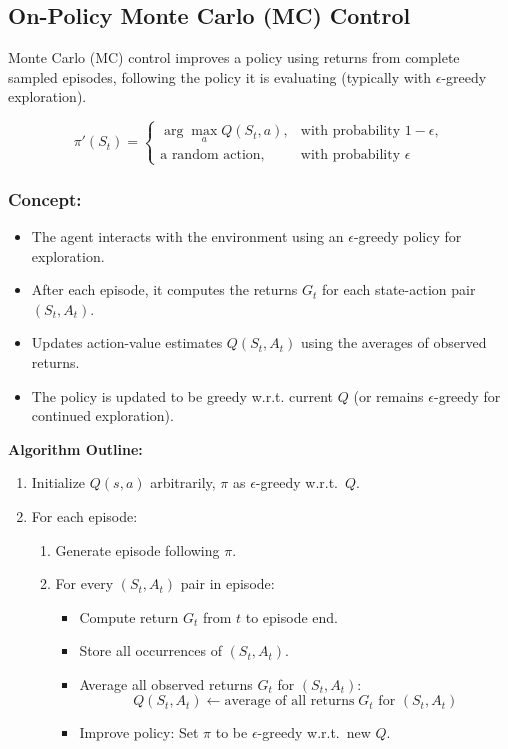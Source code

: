 \documentclass[12pt]{article}
\begin{document}
\subsection{On-Policy Monte Carlo (MC) Control}

Monte Carlo (MC) control improves a policy using returns from complete sampled episodes, following the policy it is evaluating (typically with $\epsilon$-greedy exploration).

\[
\pi'(S_t) =
\begin{cases}
\arg\max_a Q(S_t, a), & \text{with probability } 1 - \epsilon, \\
\text{a random action}, & \text{with probability } \epsilon
\end{cases}
\]


\subsubsection{Concept:}
\begin{itemize}
    \item The agent interacts with the environment using an $\epsilon$-greedy policy for exploration.
    \item After each episode, it computes the returns $G_t$ for each state-action pair $(S_t, A_t)$.
    \item Updates action-value estimates $Q(S_t, A_t)$ using the averages of observed returns.
    \item The policy is updated to be greedy w.r.t. current $Q$ (or remains $\epsilon$-greedy for continued exploration).
\end{itemize}

\textbf{Algorithm Outline:}
\begin{enumerate}
    \item Initialize $Q(s,a)$ arbitrarily, $\pi$ as $\epsilon$-greedy w.r.t.\ $Q$.
    \item For each episode:
    \begin{enumerate}
        \item Generate episode following $\pi$.
        \item For every $(S_t, A_t)$ pair in episode:
        \begin{itemize}
            \item Compute return $G_t$ from $t$ to episode end.
            \item Store all occurrences of $(S_t, A_t)$.
            \item Average all observed returns $G_t$ for $(S_t, A_t)$:
                $$
                Q(S_t, A_t) \leftarrow \text{average of all returns} \; G_t \text{ for } (S_t, A_t)
                $$
            \item Improve policy: Set $\pi$ to be $\epsilon$-greedy w.r.t.\ new $Q$.
        \end{itemize}
    \end{enumerate}
\end{enumerate}
\end{document}
